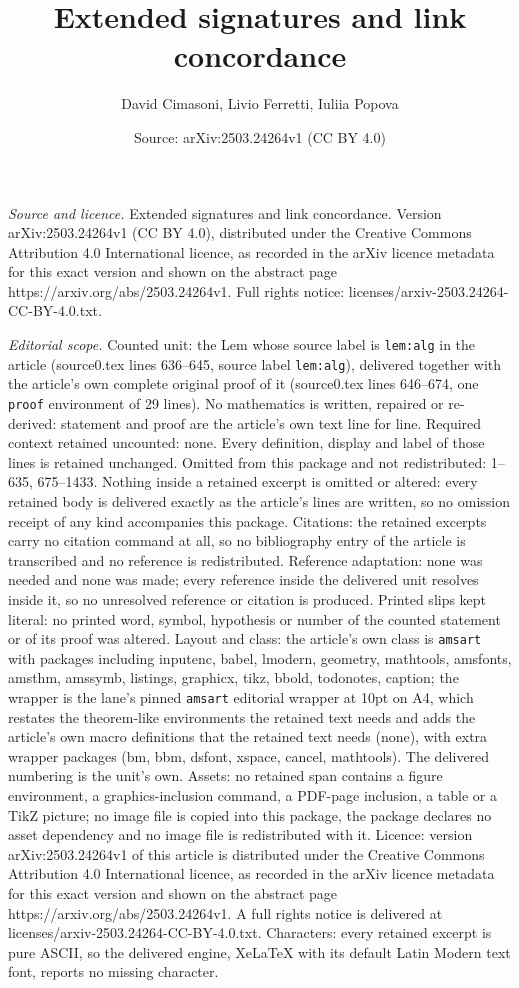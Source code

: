 \documentclass[10pt,a4paper]{amsart}
\title[Extended signatures and link concordance]{Extended signatures and link concordance}
\author{David Cimasoni, Livio Ferretti, Iuliia Popova}
\date{Source: arXiv:2503.24264v1 (CC BY 4.0)}
\begin{document}
\maketitle

\noindent\emph{Source and licence.} Extended signatures and link concordance. Version arXiv:2503.24264v1 (CC BY 4.0), distributed under the Creative Commons Attribution 4.0 International licence, as recorded in the arXiv licence metadata for this exact version and shown on the abstract page https://arxiv.org/abs/2503.24264v1. Full rights notice: licenses/arxiv-2503.24264-CC-BY-4.0.txt.\par\smallskip

\noindent\textit{Editorial scope.} Counted unit: the Lem whose source label is \texttt{lem:alg} in the article (source0.tex lines 636--645, source label \texttt{lem:alg}), delivered together with the article's own complete original proof of it (source0.tex lines 646--674, one \texttt{proof} environment of 29 lines). No mathematics is written, repaired or re-derived: statement and proof are the article's own text line for line. Required context retained uncounted: none. Every definition, display and label of those lines is retained unchanged. Omitted from this package and not redistributed: 1--635, 675--1433. Nothing inside a retained excerpt is omitted or altered: every retained body is delivered exactly as the article's lines are written, so no omission receipt of any kind accompanies this package. Citations: the retained excerpts carry no citation command at all, so no bibliography entry of the article is transcribed and no reference is redistributed. Reference adaptation: none was needed and none was made; every reference inside the delivered unit resolves inside it, so no unresolved reference or citation is produced. Printed slips kept literal: no printed word, symbol, hypothesis or number of the counted statement or of its proof was altered. Layout and class: the article's own class is \texttt{amsart} with packages including inputenc, babel, lmodern, geometry, mathtools, amsfonts, amsthm, amssymb, listings, graphicx, tikz, bbold, todonotes, caption; the wrapper is the lane's pinned \texttt{amsart} editorial wrapper at 10pt on A4, which restates the theorem-like environments the retained text needs and adds the article's own macro definitions that the retained text needs (none), with extra wrapper packages (bm, bbm, dsfont, xspace, cancel, mathtools). The delivered numbering is the unit's own. Assets: no retained span contains a figure environment, a graphics-inclusion command, a PDF-page inclusion, a table or a TikZ picture; no image file is copied into this package, the package declares no asset dependency and no image file is redistributed with it. Licence: version arXiv:2503.24264v1 of this article is distributed under the Creative Commons Attribution 4.0 International licence, as recorded in the arXiv licence metadata for this exact version and shown on the abstract page https://arxiv.org/abs/2503.24264v1. A full rights notice is delivered at licenses/arxiv-2503.24264-CC-BY-4.0.txt. Characters: every retained excerpt is pure ASCII, so the delivered engine, XeLaTeX with its default Latin Modern text font, reports no missing character.
\end{document}
